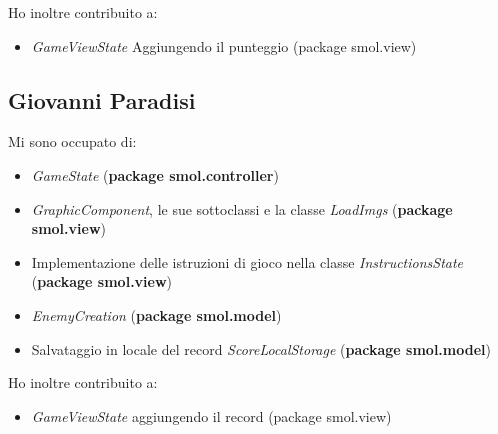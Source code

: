 \documentclass[a4paper,12pt]{report}
\begin{document}
Ho inoltre contribuito a:
\begin{itemize}
    \item \emph{GameViewState} Aggiungendo il punteggio (package smol.view)
\end{itemize}

\subsection*{Giovanni Paradisi}

Mi sono occupato di:
\begin{itemize}
    \item \emph{GameState} (\textbf{package smol.controller})
    \item \emph{GraphicComponent}, le sue sottoclassi e la classe \emph{LoadImgs} (\textbf{package smol.view})
    \item Implementazione delle istruzioni di gioco nella classe \emph{InstructionsState} (\textbf{package smol.view})
    \item \emph{EnemyCreation} (\textbf{package smol.model})
    \item Salvataggio in locale del record \emph{ScoreLocalStorage} (\textbf{package smol.model})
\end{itemize}

Ho inoltre contribuito a:
\begin{itemize}
    \item \emph{GameViewState} aggiungendo il record (package smol.view)
\end{itemize}
\end{document}
